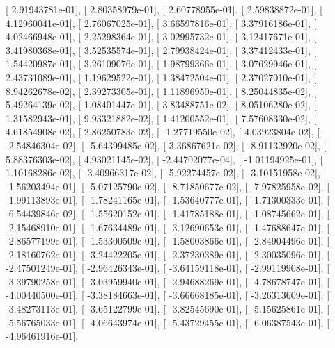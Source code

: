 \documentclass{article}
\begin{document}
       [  2.91943781e-01],
       [  2.80358979e-01],
       [  2.60778955e-01],
       [  2.59838872e-01],
       [  4.12960041e-01],
       [  2.76067025e-01],
       [  3.66597816e-01],
       [  3.37916186e-01],
       [  4.02466948e-01],
       [  2.25298364e-01],
       [  3.02995732e-01],
       [  3.12417671e-01],
       [  3.41980368e-01],
       [  3.52535574e-01],
       [  2.79938424e-01],
       [  3.37412433e-01],
       [  1.54420987e-01],
       [  3.26109076e-01],
       [  1.98799366e-01],
       [  3.07629946e-01],
       [  2.43731089e-01],
       [  1.19629522e-01],
       [  1.38472504e-01],
       [  2.37027010e-01],
       [  8.94262678e-02],
       [  2.39273305e-01],
       [  1.11896950e-01],
       [  8.25044835e-02],
       [  5.49264139e-02],
       [  1.08401447e-01],
       [  3.83488751e-02],
       [  8.05106280e-02],
       [  1.31582943e-01],
       [  9.93321882e-02],
       [  1.41200552e-01],
       [  7.57608330e-02],
       [  4.61854908e-02],
       [  2.86250783e-02],
       [ -1.27719550e-02],
       [  4.03923804e-02],
       [ -2.54846304e-02],
       [ -5.64399485e-02],
       [  3.36867621e-02],
       [ -8.91132920e-02],
       [  5.88376303e-02],
       [  4.93021145e-02],
       [ -2.44702077e-04],
       [ -1.01194925e-01],
       [  1.10168286e-02],
       [ -3.40966317e-02],
       [ -5.92274457e-02],
       [ -3.10151958e-02],
       [ -1.56203494e-01],
       [ -5.07125790e-02],
       [ -8.71850677e-02],
       [ -7.97825958e-02],
       [ -1.99113893e-01],
       [ -1.78241165e-01],
       [ -1.53640777e-01],
       [ -1.71300333e-01],
       [ -6.54439846e-02],
       [ -1.55620152e-01],
       [ -1.41785188e-01],
       [ -1.08745662e-01],
       [ -2.15468910e-01],
       [ -1.67634489e-01],
       [ -3.12690653e-01],
       [ -1.47688647e-01],
       [ -2.86577199e-01],
       [ -1.53300509e-01],
       [ -1.58003866e-01],
       [ -2.84904496e-01],
       [ -2.18160762e-01],
       [ -3.24422205e-01],
       [ -2.37230389e-01],
       [ -2.30035096e-01],
       [ -2.47501249e-01],
       [ -2.96426343e-01],
       [ -3.64159118e-01],
       [ -2.99119908e-01],
       [ -3.39790258e-01],
       [ -3.03959940e-01],
       [ -2.94688269e-01],
       [ -4.78678747e-01],
       [ -4.00440500e-01],
       [ -3.38184663e-01],
       [ -3.66668185e-01],
       [ -3.26313609e-01],
       [ -3.48273113e-01],
       [ -3.65122799e-01],
       [ -3.82545690e-01],
       [ -5.15625861e-01],
       [ -5.56765033e-01],
       [ -4.06643974e-01],
       [ -5.43729455e-01],
       [ -6.06387543e-01],
       [ -4.96461916e-01],
\end{document}
